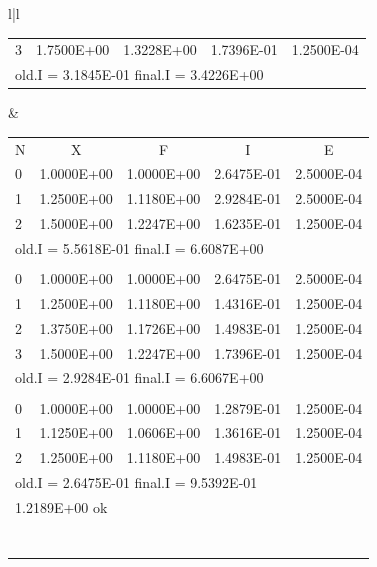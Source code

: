 \begin{figure}[H]
{\begin{tabular}{l|l}
\begin{tabular}{lllll}
            3 & 1.7500E+00 & 1.3228E+00 & 1.7396E-01 & 1.2500E-04 \\
            \multicolumn{5}{l}{old.I = 3.1845E-01 \hfill final.I = 3.4226E+00} \\
        \end{tabular}
        &
        \begin{tabular}{lllll}
            \multicolumn{1}{l}{N} & \multicolumn{1}{c}{X} &
            \multicolumn{1}{c}{F} & \multicolumn{1}{c}{I} &
            \multicolumn{1}{c}{E} \\
            0 & 1.0000E+00 & 1.0000E+00 & 2.6475E-01 & 2.5000E-04 \\
            1 & 1.2500E+00 & 1.1180E+00 & 2.9284E-01 & 2.5000E-04 \\
            2 & 1.5000E+00 & 1.2247E+00 & 1.6235E-01 & 1.2500E-04 \\
            \multicolumn{5}{l}{old.I = 5.5618E-01 \hfill final.I = 6.6087E+00} \\
            \\
            0 & 1.0000E+00 & 1.0000E+00 & 2.6475E-01 & 2.5000E-04 \\
            1 & 1.2500E+00 & 1.1180E+00 & 1.4316E-01 & 1.2500E-04 \\
            2 & 1.3750E+00 & 1.1726E+00 & 1.4983E-01 & 1.2500E-04 \\
            3 & 1.5000E+00 & 1.2247E+00 & 1.7396E-01 & 1.2500E-04 \\
            \multicolumn{5}{l}{old.I = 2.9284E-01 \hfill final.I = 6.6067E+00} \\
            \\
            0 & 1.0000E+00 & 1.0000E+00 & 1.2879E-01 & 1.2500E-04 \\
            1 & 1.1250E+00 & 1.0606E+00 & 1.3616E-01 & 1.2500E-04 \\
            2 & 1.2500E+00 & 1.1180E+00 & 1.4983E-01 & 1.2500E-04 \\
            \multicolumn{5}{l}{old.I = 2.6475E-01 \hfill final.I = 9.5392E-01} \\
            \multicolumn{5}{l}{\tikzmarked{target}1.2189E+00 ok}
            \\ \\ \\ \\ \\ \\ \\ \\
        \end{tabular}
    \end{tabular}
    }


\end{figure}
